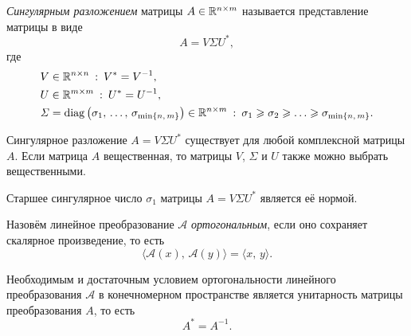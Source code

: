 \begin{definition}
        \textit{Сингулярным разложением} матрицы $A \in \mathbb{R}^{n \times m}$ называется представление матрицы в виде
$$
        A = V \mathit{\Sigma} U^*, 
$$
        где
$$
\begin{aligned}
&V \in \mathbb{R}^{n \times n}\::\: V^* = V^{-1},\\
&U \in \mathbb{R}^{m \times m}\::\: U^* = U^{-1},\\
&\mathit{\Sigma} = \mathrm{diag}\left(\sigma_1,\,\ldots,\,\sigma_{\min\{n,\,m\}}\right) \in \mathbb{R}^{n \times m}\::\:\sigma_1 \geqslant \sigma_2 \geqslant \ldots \geqslant \sigma_{\min\{n,\,m\}}.
\end{aligned}
$$ 
\end{definition}

\begin{theorem}
        Сингулярное разложение
        $A = V \mathit{\Sigma} U^*$
        существует для любой комплексной матрицы $A$.
        Если матрица $A$ вещественная, то матрицы $V$, $\mathit{\Sigma}$ и $U$ также можно выбрать вещественными. 
\end{theorem}

\begin{theorem}
        Старшее сингулярное число $\sigma_1$ матрицы $A = V \mathit{\Sigma} U^*$ является её нормой.
\end{theorem}

\begin{definition}
        Назовём линейное преобразование $\mathcal{A}$ \textit{ортогональным}, если оно сохраняет скалярное произведение, то есть
$$
        \langle \mathcal{A}(x),\,\mathcal{A}(y)\rangle = \langle x,\,y\rangle.
$$
\end{definition}

\begin{theorem}\label{th:unitarnost}
        Необходимым и достаточным условием ортогональности линейного преобразования $\mathcal{A}$ в конечномерном пространстве является унитарность матрицы преобразования $A$, то есть
$$
        A^* = A^{-1}.
$$
\end{theorem}

